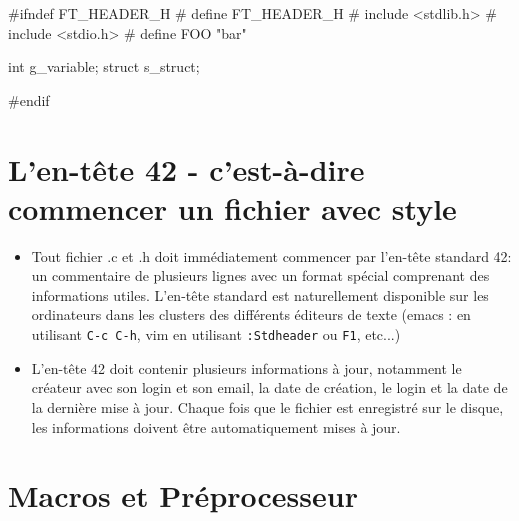 \documentclass{42-fr}
\begin{document}
        \begin{42ccode}
#ifndef FT_HEADER_H
# define FT_HEADER_H
# include <stdlib.h>
# include <stdio.h>
# define FOO "bar"

int g_variable;
struct s_struct;

#endif
        \end{42ccode}
        \newpage


    \section{L'en-tête 42 - c'est-à-dire commencer un fichier avec style}

    \begin{itemize}

    \item Tout fichier .c et .h doit immédiatement commencer par l'en-tête standard 42: 
    un commentaire de plusieurs lignes avec un format spécial comprenant des informations utiles. 
    L'en-tête standard est naturellement disponible sur les ordinateurs dans les clusters des différents éditeurs de texte 
    (emacs : en utilisant \texttt{C-c C-h}, vim en utilisant \texttt{:Stdheader} ou \texttt{F1}, etc...)

    \item L'en-tête 42 doit contenir plusieurs informations à jour, notamment le créateur avec son login et son email, 
    la date de création, le login et la date de la dernière mise à jour. 
    Chaque fois que le fichier est enregistré sur le disque, les informations doivent être automatiquement mises à jour.

    \end{itemize}
    \newpage


    \section{Macros et Préprocesseur}
\end{document}
